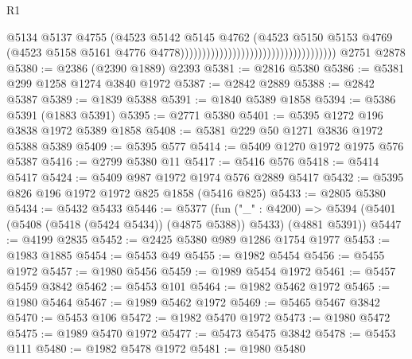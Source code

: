 \begin{lexlean}{R1}
\begin{coremodule}
                                                                      @5134
                                                                      @5137
                                                                      @4755
                                                                      (@4523
                                                                        @5142
                                                                        @5145
                                                                        @4762
                                                                        (@4523
                                                                          @5150
                                                                          @5153
                                                                          @4769
                                                                          (@4523
                                                                            @5158
                                                                            @5161
                                                                            @4776
                                                                            @4778))))))))))))))))))))))))))))))))))))
    @2751
    @2878
@5380 := @2386 (@2390 @1889) @2393
@5381 := @2816 @5380
@5386 := @5381 @299 @1258 @1274 @3840 @1972
@5387 := @2842 @2889
@5388 := @2842 @5387
@5389 := @1839 @5388
@5391 := @1840 @5389 @1858
@5394 := @5386 @5391 (@1883 @5391)
@5395 := @2771 @5380
@5401 := @5395 @1272 @196 @3838 @1972 @5389 @1858
@5408 := @5381 @229 @50 @1271 @3836 @1972 @5388 @5389
@5409 := @5395 @577
@5414 := @5409 @1270 @1972 @1975 @576 @5387
@5416 := @2799 @5380 @11
@5417 := @5416 @576
@5418 := @5414 @5417
@5424 := @5409 @987 @1972 @1974 @576 @2889 @5417
@5432 := @5395 @826 @196 @1972 @1972 @825 @1858 (@5416 @825)
@5433 := @2805 @5380
@5434 := @5432 @5433
@5446 := @5377
    (fun ("_" : @4200) =>
    @5394 (@5401 (@5408 (@5418 (@5424 @5434)) (@4875 @5388)) @5433) (@4881 @5391))
@5447 := @4199 @2835
@5452 := @2425 @5380 @989 @1286 @1754 @1977
@5453 := @1983 @1885
@5454 := @5453 @49
@5455 := @1982 @5454
@5456 := @5455 @1972
@5457 := @1980 @5456
@5459 := @1989 @5454 @1972
@5461 := @5457 @5459 @3842
@5462 := @5453 @101
@5464 := @1982 @5462 @1972
@5465 := @1980 @5464
@5467 := @1989 @5462 @1972
@5469 := @5465 @5467 @3842
@5470 := @5453 @106
@5472 := @1982 @5470 @1972
@5473 := @1980 @5472
@5475 := @1989 @5470 @1972
@5477 := @5473 @5475 @3842
@5478 := @5453 @111
@5480 := @1982 @5478 @1972
@5481 := @1980 @5480

\end{coremodule}
\end{lexlean}
